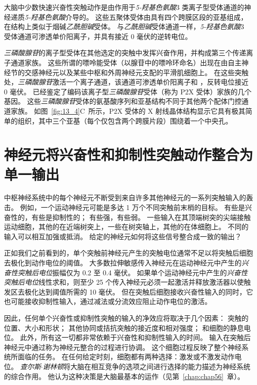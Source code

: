大脑中少数快速兴奋性突触动作是由作用于\textit{5-羟基色氨酸}3 类离子型受体通道的神经递质\textit{5-羟基色氨酸}介导的。
这些五聚体受体由具有四个跨膜区段的亚基组成，在结构上类似于烟碱\textit{乙酰胆碱}受体。
与\textit{乙酰胆碱}受体通道一样，\textit{5-羟基色氨酸}3 受体通道可渗透单价阳离子，并具有接近 0 毫伏的逆转电位。


\textit{三磷酸腺苷}的离子型受体在其他选定的突触中发挥兴奋作用，并构成第三个传递离子通道家族。
这些所谓的嘌呤能受体（以腺苷中的嘌呤环命名）出现在由自主神经节的交感神经元以及某些中枢和外周神经元支配的平滑肌细胞上。
在这些突触处，\textit{三磷酸腺苷}激活一个离子通道，该通道可渗透单价阳离子和 ，反转电位接近 0 毫伏。
已经鉴定了编码该离子型\textit{三磷酸腺苷}受体（称为 P2X 受体）家族的几个基因。
这些\textit{三磷酸腺苷}受体的氨基酸序列和亚基结构不同于其他两个配体门控通道家族。
如图~\ref{fig:13_4}C~所示，P2X 受体的 X 射线晶体结构显示它具有极其简单的组织，其中三个亚基（每个仅包含两个跨膜片段）围绕着一个中央孔。



\section{神经元将兴奋性和抑制性突触动作整合为单一输出}

中枢神经系统中的每个神经元不断受到来自许多其他神经元的一系列突触输入的轰击。
例如，一个运动神经元可能是多达 1 万个不同突触前末梢的目标。
有些是兴奋性的，有些是抑制性的；
有些强，有些弱。
一些输入在其顶端树突的尖端接触运动细胞，其他的在近端树突上，一些在树突轴上，其他的在体细胞上。
不同的输入可以相互加强或抵消。
给定的神经元如何将这些信号整合成一致的输出？


正如我们之前看到的，单个突触前神经元产生的突触电位通常不足以将突触后细胞去极化到动作电位的阈值。
大多数拉伸敏感传入神经元在运动神经元中产生的\textit{兴奋性突触后电位}振幅仅为 0.2 至 0.4 毫伏。
如果单个运动神经元中产生的\textit{兴奋性突触后电位}线性求和，则至少 25 个传入神经元必须一起激活并释放激活器以使触发区去极化达到阈值所需的 10 毫伏。
但在突触后细胞接收兴奋性输入的同时，它也可能接收抑制性输入，通过减法或分流效应阻止动作电位的激活。


因此，任何单个兴奋性或抑制性突触的输入的净效应将取决于几个因素：
突触的位置、大小和形状；
其他协同或拮抗突触的接近度和相对强度；
和细胞的静息电位。 
此外，所有这一切都非常依赖于兴奋性和抑制性输入的时间。
输入在突触后神经元中通过称为神经元整合的过程进行协调。
这个细胞过程反映了整个神经系统所面临的任务。
在任何给定时刻，细胞都有两种选择：激发或不激发动作电位。
\textit{查尔斯$\cdot$谢林顿}将大脑在相互竞争的选项之间进行选择的能力描述为神经系统的综合作用。
他认为这种决策是大脑最基本的运作（见第~\ref{chap:chap56}~章）。



